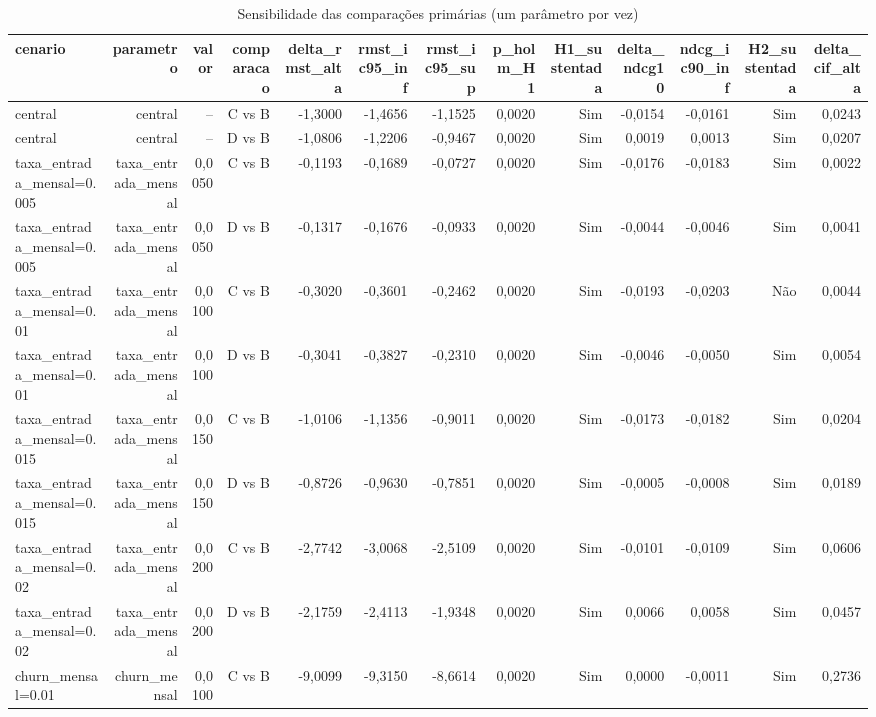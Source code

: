 \begin{table}[ht]
\centering
\caption{Sensibilidade das comparações primárias (um parâmetro por vez)}
\label{tab:sensibilidade}
\begin{tabular}{lrrrrrrrrrrrr}
\hline
\textbf{cenario} & \textbf{parametro} & \textbf{valor} & \textbf{comparacao} & \textbf{delta\_rmst\_alta} & \textbf{rmst\_ic95\_inf} & \textbf{rmst\_ic95\_sup} & \textbf{p\_holm\_H1} & \textbf{H1\_sustentada} & \textbf{delta\_ndcg10} & \textbf{ndcg\_ic90\_inf} & \textbf{H2\_sustentada} & \textbf{delta\_cif\_alta} \\
\hline
central & central & -- & C vs B & -1,3000 & -1,4656 & -1,1525 & 0,0020 & Sim & -0,0154 & -0,0161 & Sim & 0,0243 \\
central & central & -- & D vs B & -1,0806 & -1,2206 & -0,9467 & 0,0020 & Sim & 0,0019 & 0,0013 & Sim & 0,0207 \\
taxa\_entrada\_mensal=0.005 & taxa\_entrada\_mensal & 0,0050 & C vs B & -0,1193 & -0,1689 & -0,0727 & 0,0020 & Sim & -0,0176 & -0,0183 & Sim & 0,0022 \\
taxa\_entrada\_mensal=0.005 & taxa\_entrada\_mensal & 0,0050 & D vs B & -0,1317 & -0,1676 & -0,0933 & 0,0020 & Sim & -0,0044 & -0,0046 & Sim & 0,0041 \\
taxa\_entrada\_mensal=0.01 & taxa\_entrada\_mensal & 0,0100 & C vs B & -0,3020 & -0,3601 & -0,2462 & 0,0020 & Sim & -0,0193 & -0,0203 & Não & 0,0044 \\
taxa\_entrada\_mensal=0.01 & taxa\_entrada\_mensal & 0,0100 & D vs B & -0,3041 & -0,3827 & -0,2310 & 0,0020 & Sim & -0,0046 & -0,0050 & Sim & 0,0054 \\
taxa\_entrada\_mensal=0.015 & taxa\_entrada\_mensal & 0,0150 & C vs B & -1,0106 & -1,1356 & -0,9011 & 0,0020 & Sim & -0,0173 & -0,0182 & Sim & 0,0204 \\
taxa\_entrada\_mensal=0.015 & taxa\_entrada\_mensal & 0,0150 & D vs B & -0,8726 & -0,9630 & -0,7851 & 0,0020 & Sim & -0,0005 & -0,0008 & Sim & 0,0189 \\
taxa\_entrada\_mensal=0.02 & taxa\_entrada\_mensal & 0,0200 & C vs B & -2,7742 & -3,0068 & -2,5109 & 0,0020 & Sim & -0,0101 & -0,0109 & Sim & 0,0606 \\
taxa\_entrada\_mensal=0.02 & taxa\_entrada\_mensal & 0,0200 & D vs B & -2,1759 & -2,4113 & -1,9348 & 0,0020 & Sim & 0,0066 & 0,0058 & Sim & 0,0457 \\
churn\_mensal=0.01 & churn\_mensal & 0,0100 & C vs B & -9,0099 & -9,3150 & -8,6614 & 0,0020 & Sim & 0,0000 & -0,0011 & Sim & 0,2736 \\

\end{tabular}
\end{table}
